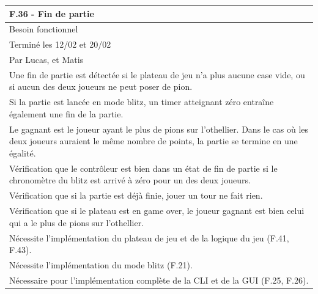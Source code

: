 \documentclass[a4paper,12pt]{article}
\begin{document}
\noindent
\setlength{\arrayrulewidth}{1.5pt}
\renewcommand{\arraystretch}{1.5}
\begin{tabularx}{\textwidth}{|X|}
    \hline
    \textbf{F.36 - Fin de partie}                                                                                                                                            \\
    \hline
    Besoin fonctionnel                                                                                                                                                       \\
    \hline
    Terminé les 12/02 et 20/02                                                                                                                                               \\
    Par Lucas, et Matis                                                                                                                                                      \\
    \hline
    Une fin de partie est détectée si le plateau de jeu n’a plus aucune case vide, ou si aucun des deux joueurs ne peut poser de pion.                                       \\
    Si la partie est lancée en mode blitz, un timer atteignant zéro entraîne également une fin de la partie.                                                                 \\
    Le gagnant est le joueur ayant le plus de pions sur l’othellier. Dans le cas où les deux joueurs auraient le même nombre de points, la partie se termine en une égalité. \\
    \arrayrulecolor{MediumAquamarine}\hline
    \arrayrulecolor{CornflowerBlue}
    Vérification que le contrôleur est bien dans un état de fin de partie si le chronomètre du blitz est arrivé à zéro pour un des deux joueurs.                             \\
    Vérification que si la partie est déjà finie, jouer un tour ne fait rien.                                                                                                \\
    Vérification que si le plateau est en game over, le joueur gagnant est bien celui qui a le plus de pions sur l’othellier.                                                \\
    \arrayrulecolor{MediumAquamarine}\hline
    \arrayrulecolor{CornflowerBlue}
    Nécessite l’implémentation du plateau de jeu et de la logique du jeu (F.41, F.43).                                                                                       \\
    Nécessite l’implémentation du mode blitz (F.21).                                                                                                                         \\
    Nécessaire pour l’implémentation complète de la CLI et de la GUI (F.25, F.26).                                                                                           \\
    \hline
\end{tabularx}
\end{document}
